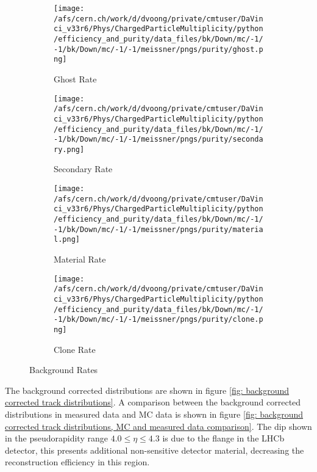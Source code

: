 \begin{figure}
	\centering
	\begin{subfigure}[h]{0.49\textwidth}
		\texttt{[image: /afs/cern.ch/work/d/dvoong/private/cmtuser/DaVinci\_v33r6/Phys/ChargedParticleMultiplicity/python/efficiency\_and\_purity/data\_files/bk/Down/mc/-1/-1/bk/Down/mc/-1/-1/meissner/pngs/purity/ghost.png]}
		\caption{Ghost Rate}
		\label{}
	\end{subfigure}
	\begin{subfigure}[h]{0.49\textwidth}
		\texttt{[image: /afs/cern.ch/work/d/dvoong/private/cmtuser/DaVinci\_v33r6/Phys/ChargedParticleMultiplicity/python/efficiency\_and\_purity/data\_files/bk/Down/mc/-1/-1/bk/Down/mc/-1/-1/meissner/pngs/purity/secondary.png]}
		\caption{Secondary Rate}
		\label{}
	\end{subfigure}
	\begin{subfigure}[h]{0.49\textwidth}
		\texttt{[image: /afs/cern.ch/work/d/dvoong/private/cmtuser/DaVinci\_v33r6/Phys/ChargedParticleMultiplicity/python/efficiency\_and\_purity/data\_files/bk/Down/mc/-1/-1/bk/Down/mc/-1/-1/meissner/pngs/purity/material.png]}
		\caption{Material Rate}
		\label{}
	\end{subfigure}
	\begin{subfigure}[h]{0.49\textwidth}
		\texttt{[image: /afs/cern.ch/work/d/dvoong/private/cmtuser/DaVinci\_v33r6/Phys/ChargedParticleMultiplicity/python/efficiency\_and\_purity/data\_files/bk/Down/mc/-1/-1/bk/Down/mc/-1/-1/meissner/pngs/purity/clone.png]}
		\caption{Clone Rate}
		\label{fig: clone rate}
	\end{subfigure}
	\caption{Background Rates}
	\label{fig: background rates}
\end{figure}

The background corrected distributions are shown in figure \ref{fig: background corrected track distributions}. A comparison between the background corrected distributions in measured data and MC data is shown in figure \ref{fig: background corrected track distributions, MC and measured data comparison}. The dip shown in the pseudorapidity range $4.0 \le \eta \le 4.3$ is due to the flange \cite{Alves:1129809} in the LHCb detector, this presents additional non-sensitive detector material, decreasing the reconstruction efficiency in this region. %


